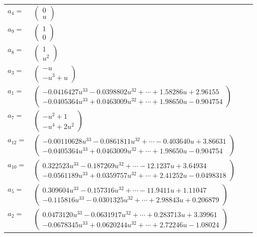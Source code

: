 \documentclass[1p]{elsarticle_modified}
\theoremstyle{definition}
\begin{document}
\begin{tabular}{m{7pt} m{180pt} m{7pt} m{180pt} }
\flushright $a_{4}=$&$\begin{pmatrix}0\\u\end{pmatrix}$ \\
\flushright $a_{9}=$&$\begin{pmatrix}1\\0\end{pmatrix}$ \\
\flushright $a_{8}=$&$\begin{pmatrix}1\\u^2\end{pmatrix}$ \\
\flushright $a_{3}=$&$\begin{pmatrix}- u\\- u^3+u\end{pmatrix}$ \\
\flushright $a_{1}=$&$\begin{pmatrix}-0.0416427 u^{33}-0.0398802 u^{32}+\cdots+1.58286 u+2.96155\\-0.0405364 u^{33}+0.0463009 u^{32}+\cdots+1.98650 u-0.904754\end{pmatrix}$ \\
\flushright $a_{7}=$&$\begin{pmatrix}- u^2+1\\- u^4+2 u^2\end{pmatrix}$ \\
\flushright $a_{12}=$&$\begin{pmatrix}-0.00110628 u^{33}-0.0861811 u^{32}+\cdots-0.403640 u+3.86631\\-0.0405364 u^{33}+0.0463009 u^{32}+\cdots+1.98650 u-0.904754\end{pmatrix}$ \\
\flushright $a_{10}=$&$\begin{pmatrix}0.322523 u^{33}-0.187269 u^{32}+\cdots-12.1237 u+3.64934\\-0.0561189 u^{33}+0.0359757 u^{32}+\cdots+2.41252 u-0.0498318\end{pmatrix}$ \\
\flushright $a_{5}=$&$\begin{pmatrix}0.309604 u^{33}-0.157316 u^{32}+\cdots-11.9411 u+1.11047\\-0.115816 u^{33}-0.0301325 u^{32}+\cdots+2.98843 u+0.206879\end{pmatrix}$ \\
\flushright $a_{2}=$&$\begin{pmatrix}0.0473120 u^{33}-0.0631917 u^{32}+\cdots+0.283713 u+3.39961\\-0.0678345 u^{33}+0.0620244 u^{32}+\cdots+2.72246 u-1.08024\end{pmatrix}$ \\

\end{tabular}
\end{document}
